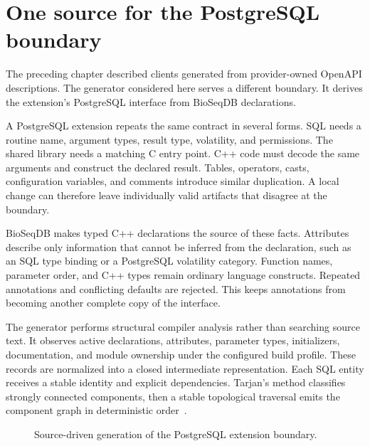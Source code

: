 \section{One source for the PostgreSQL boundary}
\label{sec:sql-codegen}

The preceding chapter described clients generated from provider-owned OpenAPI
descriptions. The generator considered here serves a different boundary. It
derives the extension's PostgreSQL interface from BioSeqDB declarations.

A PostgreSQL extension repeats the same contract in several forms. SQL needs a
routine name, argument types, result type, volatility, and permissions. The
shared library needs a matching C entry point. C++ code must decode the same
arguments and construct the declared result. Tables, operators, casts,
configuration variables, and comments introduce similar duplication. A local
change can therefore leave individually valid artifacts that disagree at the
boundary.

BioSeqDB makes typed C++ declarations the source of these facts. Attributes
describe only information that cannot be inferred from the declaration, such
as an SQL type binding or a PostgreSQL volatility category. Function names,
parameter order, and C++ types remain ordinary language constructs. Repeated
annotations and conflicting defaults are rejected. This keeps annotations from
becoming another complete copy of the interface.

The generator performs structural compiler analysis rather than searching
source text. It observes active declarations, attributes, parameter types,
initializers, documentation, and module ownership under the configured build
profile. These records are normalized into a closed intermediate
representation. Each SQL entity receives a stable identity and explicit
dependencies. Tarjan's method classifies strongly connected components, then
a stable topological traversal emits the component graph in deterministic
order~\cite{tarjan_1972_depth_first_search}.

\begin{figure}[htbp]
  \centering
  \caption{Source-driven generation of the PostgreSQL extension boundary.}
  \label{fig:sql-codegen-flow}
\end{figure}

